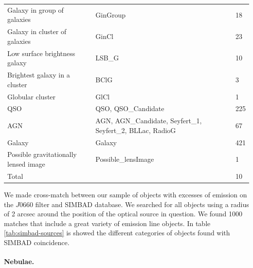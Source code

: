 \documentclass[fleqn,usenatbib]{mnras}
\begin{document}
\begin{table}
\begin{tabular}{lll}
Galaxy in group of galaxies     & GinGroup           & 18                \\
Galaxy in cluster of galaxies   & GinCl              & 23                \\
Low surface brightness galaxy   & LSB\_G             & 10                \\
Brightest galaxy in a cluster   & BClG               & 3                 \\
Globular cluster            & GlCl                   & 1                 \\
QSO                         & QSO, QSO\_Candidate    & 225               \\
AGN                         & AGN, AGN\_Candidate, Seyfert\_1, Seyfert\_2, BLLac, RadioG & 67\\
Galaxy                      &  Galaxy                & 421               \\
Possible gravitationally lensed image & Possible\_lensImage & 1          \\
\hline
Total                       &                               & 10         \\
\hline
\end{tabular}
\end{table}

We made cross-match between our sample of objects with excesses of emission on
the $J$0660 filter and SIMBAD database. We searched for all objects using a radius of 2 arcsec
around the position of the optical source in question. We found 1000
matches that include a great variety of emission line objects. In table
\ref{tab:simbad-sources} is showed the different categories of objects found
with SIMBAD coincidence.

\paragraph{Nebulae.}
\end{document}
